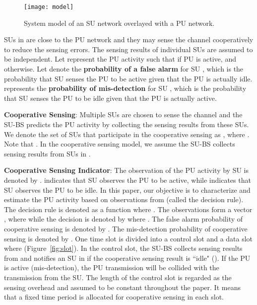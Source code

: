 \documentclass[conference]{IEEEtran}
\begin{document}
\begin{figure}[tb]
    \begin{center}
    \setlength{\unitlength}{1in}
    \texttt{[image: model]}
    \end{center}
\vspace{-1.2em}
\caption{System model of an SU network overlayed with a PU network.}
\vspace{-1.8em}
\label{fig:model}
\end{figure}

SUs in  are close to the PU network and they may sense the channel cooperatively to reduce the sensing errors. The sensing results of individual SUs are assumed to be independent. Let  represent the PU activity such that  if PU is active, and  otherwise. Let  denote the {\bf probability of a false alarm} for SU , which is the probability that SU  senses the PU to be active given that the PU is actually idle.  represents the {\bf probability of mis-detection} for SU , which is the probability that SU  senses the PU to be idle given that the PU is actually active. 

{\bf Cooperative Sensing}: Multiple SUs are chosen to sense the channel and the SU-BS predicts the PU activity by collecting the sensing results from these SUs. We denote the set of SUs that participate in the cooperative sensing as , where . Note that . In the cooperative sensing model, we assume the SU-BS collects sensing results from SUs in . 

{\bf Cooperative Sensing Indicator}: The observation of the PU activity by SU  is denoted by .  indicates that SU  observes the PU to be active, while  indicates that SU  observes the PU to be idle. In this paper, our objective is to characterize  and estimate the PU activity based on observations from  (called the decision rule). The decision rule is denoted as a function  where . The observations form a vector , where  while the decision is denoted by  where . The false alarm probability of cooperative sensing is denoted by . The mis-detection probability of cooperative sensing is denoted by . One time slot is divided into a control slot  and a data slot  where  (Figure~\ref{fig:slot}). In the control slot, the SU-BS collects sensing results from  and notifies an SU in  if the cooperative sensing result is ``idle" (). If the PU is active (mis-detection), the PU transmission will be collided with the transmission from the SU. The length  of the control slot is regarded as the sensing overhead and assumed to be constant throughout the paper. It means that a fixed time period is allocated for cooperative sensing in each slot.  
\end{document}
